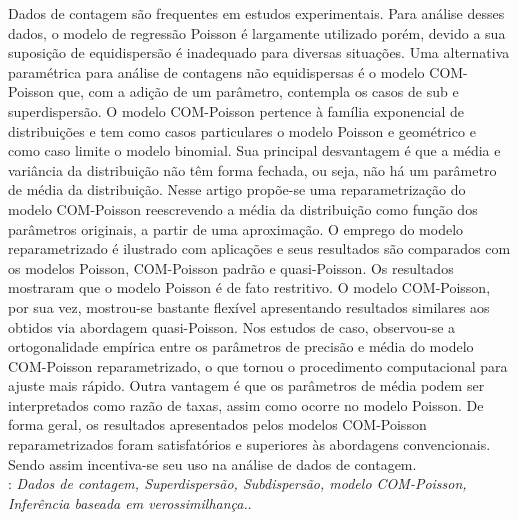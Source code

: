 \documentclass[12pt, a4paper]{article}
\begin{document}
\noindent
Dados de contagem são frequentes em estudos experimentais. Para análise
desses dados, o modelo de regressão Poisson é largamente utilizado
porém, devido a sua suposição de equidispersão é inadequado para
diversas situações. Uma alternativa paramétrica para análise de
contagens não equidispersas é o modelo COM-Poisson que, com a adição de
um parâmetro, contempla os casos de sub e superdispersão. O modelo
COM-Poisson pertence à família exponencial de distribuições e tem como
casos particulares o modelo Poisson e geométrico e como caso limite o
modelo binomial. Sua principal desvantagem é que a média e variância da
distribuição não têm forma fechada, ou seja, não há um parâmetro de
média da distribuição. Nesse artigo propõe-se uma reparametrização do
modelo COM-Poisson reescrevendo a média da distribuição como função dos
parâmetros originais, a partir de uma aproximação. O emprego do modelo
reparametrizado é ilustrado com aplicações e seus resultados são
comparados com os modelos Poisson, COM-Poisson padrão e
quasi-Poisson. Os resultados mostraram que o modelo Poisson é de fato
restritivo. O modelo COM-Poisson, por sua vez, mostrou-se bastante
flexível apresentando resultados similares aos obtidos via abordagem
quasi-Poisson. Nos estudos de caso, observou-se a ortogonalidade
empírica entre os parâmetros de precisão e média do modelo COM-Poisson
reparametrizado, o que tornou o procedimento computacional para ajuste
mais rápido. Outra vantagem é que os parâmetros de média podem ser
interpretados como razão de taxas, assim como ocorre no modelo
Poisson. De forma geral, os resultados apresentados pelos modelos
COM-Poisson reparametrizados foram satisfatórios e superiores às
abordagens convencionais. Sendo assim incentiva-se seu uso na análise de
dados de contagem.
\\

: {\it Dados de contagem, Superdispersão,
  Subdispersão, modelo COM-Poisson, Inferência baseada em
  verossimilhança.}.\\
\end{document}
